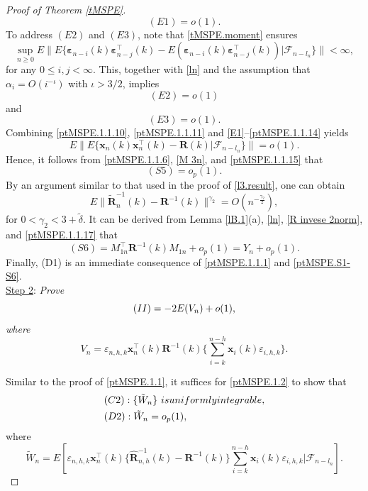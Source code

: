 \documentclass[ejsv2]{imsart}
\theoremstyle{plain}
\theoremstyle{definition}
\theoremstyle{remark}
\begin{document}
\begin{proof}[Proof of Theorem \ref{tMSPE}]
{\begin{equation}
(E1)=o(1).
\end{equation}
To address $(E2)$ and $(E3)$, note that \eqref{tMSPE.moment} ensures
$$\sup\limits_{n\geq0} E\lVert E\{\bm{\varepsilon}_{n-i}(k)\bm{\varepsilon}_{n-j}^\top(k)-E(\bm{\varepsilon}_{n-i}(k)\bm{\varepsilon}_{n-j}^\top(k))|\mathcal{F}_{n-l_n}\}\rVert<\infty,$$
for any $0\leq i,j<\infty$. This, together with \eqref{ln} and the assumption that $\alpha_i=O(i^{-\iota})$ with $\iota>3/2$, implies  
\begin{equation}\label{ptMSPE.1.1.13}
(E2)=o(1)
\end{equation}
and
\begin{equation}\label{ptMSPE.1.1.14}
(E3)=o(1).
\end{equation}
Combining \eqref{ptMSPE.1.1.10}, \eqref{ptMSPE.1.1.11} and \eqref{E1}--\eqref{ptMSPE.1.1.14} yields
\begin{equation}\label{ptMSPE.1.1.15}
E\lVert E\{\mathbf{x}_n(k)\mathbf{x}_n^\top(k)-\mathbf{R}(k)|\mathcal{F}_{n-l_n}\}\rVert =o(1).
\end{equation}
Hence, it follows from \eqref{ptMSPE.1.1.6}, \eqref{M 3n}, and \eqref{ptMSPE.1.1.15} that
\begin{equation}\label{ptMSPE.1.1.16}
(S5)=o_p(1).
\end{equation}
By an argument similar to that used in the proof of \eqref{l3.result}, one can obtain
\begin{equation}\label{ptMSPE.1.1.17}
E\lVert\tilde{\mathbf{R}}^{-1}_n(k)-\mathbf{R}^{-1}(k)\rVert^{\gamma_2}=O(n^{-\frac{\gamma_2}{2}}),
\end{equation}
for $0<\gamma_2< 3+\tilde{\delta}$. It can be derived from Lemma \ref{lB.1}(a), \eqref{ln}, \eqref{R invese 2norm}, and \eqref{ptMSPE.1.1.17} that
\begin{equation}\label{ptMSPE.1.1.18}
      (S6)=M_{1n}^\top\mathbf{R}^{-1}(k)M_{1n}+o_p(1)=Y_n+o_p(1).
\end{equation}
Finally, (D1)  is an immediate consequence
of \eqref{ptMSPE.1.1.1} and \eqref{ptMSPE.S1-S6}.\\

\noindent
\underline{Step 2}: \textit{Prove 
\begin{equation}\label{ptMSPE.1.2}
{\rm (II)}
=-2E(V_n)+o(1),
\end{equation}
where
$$V_n=
\varepsilon_{n,h,k}\mathbf{x}^\top_n(k)\mathbf{R}^{-1}(k)\{\sum_{i=k}^{n-h}\mathbf{x}_i(k)\varepsilon_{i,h,k}\}.$$}

Similar to
the proof of
\eqref{ptMSPE.1.1}, it suffices
for \eqref{ptMSPE.1.2} to show that
\begin{align*}\label{ptMSPE.1.2.0}
\begin{split}
&{\rm (C2)}: \{\tilde{W}_n\}\ \textrm{is uniformly integrable},\\ 
&{\rm (D2)}: \tilde{W}_n=o_p(1),
\end{split}
\end{align*}
where
$$\tilde{W}_n=E[\varepsilon_{n,h,k}\mathbf{x}^\top_n(k)\{\hat{\mathbf{R}}_{n,h}^{-1}(k)-\mathbf{R}^{-1}(k)\}\sum_{i=k}^{n-h}\mathbf{x}_i(k)\varepsilon_{i,h,k}
|\mathcal{F}_{n-l_n}].$$

}
\end{proof}
\end{document}
